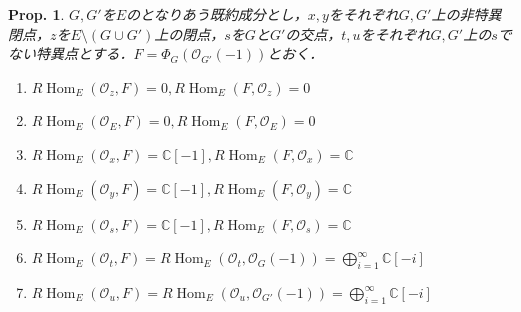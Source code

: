 \documentclass[uplatex,a4paper,11pt,dvipdfmx]{jsarticle}
\theoremstyle{mystyle} %
\newtheorem{proposition}[theorem]{Prop.}
\DeclareMathOperator{\Hom}{Hom}
\begin{document}
\begin{proposition}
	$G, G'$を$E$のとなりあう既約成分とし，$x,y$をそれぞれ$G, G'$上の非特異閉点，$z$を$E \setminus (G \cup G')$上の閉点，$s$を$G$と$G'$の交点，$t, u$をそれぞれ$G, G'$上の$s$でない特異点とする．$F = \Phi_G(\mathcal{O}_{G'}(-1))$とおく．
	\begin{enumerate}
		\item $R\Hom_E(\mathcal{O}_z, F) = 0, R\Hom_E(F,\mathcal{O}_z)=0$
		\item $R\Hom_E(\mathcal{O}_E, F) = 0, R\Hom_E(F,\mathcal{O}_E)=0$
		\item $R\Hom_E(\mathcal{O}_x, F) = \mathbb{C}[-1], R\Hom_E(F,\mathcal{O}_x)=\mathbb{C}$
		\item $R\Hom_E(\mathcal{O}_y, F) = \mathbb{C}[-1], R\Hom_E(F,\mathcal{O}_y)=\mathbb{C}$
		\item $R\Hom_E( \mathcal{O}_s, F) =\mathbb{C}[-1], R\Hom_E(F, \mathcal{O}_s) =\mathbb{C}$
		\item $R\Hom_E( \mathcal{O}_t, F) = R\Hom_E( \mathcal{O}_t, \mathcal{O}_G(-1)) = \bigoplus_{i=1}^\infty\mathbb{C}[-i]$
		\item $R\Hom_E(\mathcal{O}_u, F) = R\Hom_E( \mathcal{O}_u, \mathcal{O}_{G'}(-1)) = \bigoplus_{i=1}^\infty\mathbb{C}[-i]$
	\end{enumerate}
\end{proposition}
\end{document}
